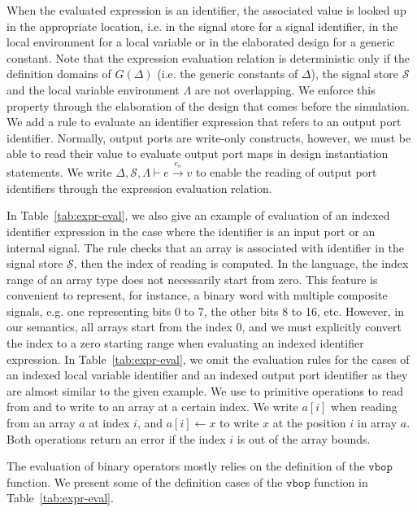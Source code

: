 When the evaluated expression is an identifier, the associated value
is looked up in the appropriate location, i.e. in the signal store for
a signal identifier, in the local environment for a local variable or
in the elaborated design for a generic constant. Note that the
expression evaluation relation is deterministic only if the definition
domains of $G(\Delta)$ (i.e. the generic constants of $\Delta$), the
signal store $\mathcal{S}$ and the local variable environment
$\Lambda$ are not overlapping. We enforce this property through the
elaboration of the design that comes before the simulation. We add a
rule to evaluate an identifier expression that refers to an output
port identifier. Normally, output ports are write-only constructs,
however, we must be able to read their value to evaluate output port
maps in design instantiation statements. We write
$\Delta,\mathcal{S},\Lambda\vdash{}e\xrightarrow{e_o}v$ to enable the
reading of output port identifiers through the expression evaluation
relation.

In Table~\ref{tab:expr-eval}, we also give an example of evaluation of
an indexed identifier expression in the case where the identifier is
an input port or an internal signal. The rule checks that an array is
associated with identifier in the signal store $\mathcal{S}$, then the
index of reading is computed. In the \hvhdl{} language, the index
range of an array type does not necessarily start from zero. This
feature is convenient to represent, for instance, a binary word with
multiple composite signals, e.g. one representing bits 0 to 7, the
other bits 8 to 16, etc. However, in our semantics, all arrays start
from the index 0, and we must explicitly convert the index to a zero
starting range when evaluating an indexed identifier expression. In
Table~\ref{tab:expr-eval}, we omit the evaluation rules for the cases
of an indexed local variable identifier and an indexed output port
identifier as they are almost similar to the given example. We use to
primitive operations to read from and to write to an array at a
certain index. We write $a[i]$ when reading from an array $a$ at index
$i$, and $a[i]\leftarrow{}x$ to write $x$ at the position $i$ in array
$a$. Both operations return an error if the index $i$ is out of the
array bounds.

The evaluation of binary operators mostly relies on the definition of
the $\mathtt{vbop}$ function. We present some of the definition cases
of the $\mathtt{vbop}$ function in Table~\ref{tab:expr-eval}.

